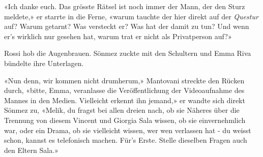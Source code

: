 «Ich danke euch. Das grösste Rätsel ist noch immer der Mann, der den
Sturz meldete,» er starrte in die Ferne, «warum tauchte der hier
direkt auf der \emph{Questur} auf? Warum getarnt? Was versteckt er? Was hat der
damit zu tun? Und wenn er’s wirklich nur gesehen hat, warum trat er
nicht als Privatperson auf?»

Rossi hob die Augenbrauen. Sönmez zuckte mit den Schultern und Emma Riva
bündelte ihre Unterlagen.

«Nun denn, wir kommen nicht drumherum,» Mantovani streckte den Rücken
durch, «bitte, Emma, veranlasse die Veröffentlichung der Videoaufnahme
des Mannes in den Medien. Vielleicht erkennt ihn jemand,» er wandte sich
direkt Sönmez zu, «Melik, du fragst bei allen dreien nach, ob sie Näheres
über die Trennung von diesem Vincent und Giorgia Sala wissen, ob sie
einvernehmlich war, oder ein Drama, ob sie vielleicht wissen, wer wen
verlassen hat - du weisst schon, kannst es telefonisch machen. Für’s
Erste. Stelle dieselben Fragen auch den Eltern Sala.»
